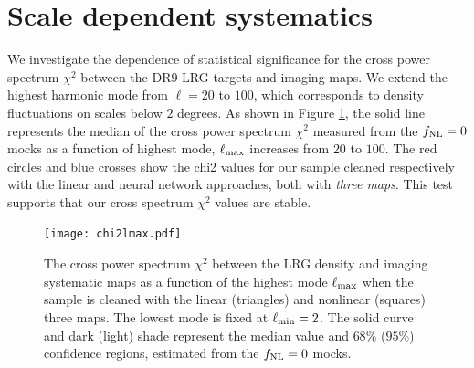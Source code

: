 \section{Scale dependent systematics}\label{sec:scalesys}
We investigate the dependence of statistical significance for the cross power spectrum $\chi^{2}$ between the DR9 LRG targets and imaging maps. We extend the highest harmonic mode from $\ell=20$ to $100$, which corresponds to density fluctuations on scales below $2$ degrees. As shown in Figure \ref{fig:chi2cellextend}, the solid line represents the median of the cross power spectrum $\chi^{2}$ measured from the $f_{\rm NL}=0$ mocks as a function of highest mode, $\ell_{\rm max}$ increases from $20$ to $100$. The red circles and blue crosses show the chi2 values for our sample cleaned respectively with the linear and neural network approaches, both with \textit{three maps}.  This test supports that our cross spectrum $\chi^{2}$ values are stable. 

\begin{figure}
\centering
\texttt{[image: chi2lmax.pdf]}
\caption{The cross power spectrum $\chi^{2}$ between the LRG density and imaging systematic maps as a function of the highest mode $\ell_{\rm max}$ when the sample is cleaned with the linear (triangles) and nonlinear (squares) three maps. The lowest mode is fixed at $\ell_{\rm min}=2$. The solid curve and dark (light) shade represent the median value and $68\%$ ($95\%$) confidence regions, estimated from the $f_{\rm NL}=0$ mocks.}\label{fig:chi2cellextend}
\end{figure}



